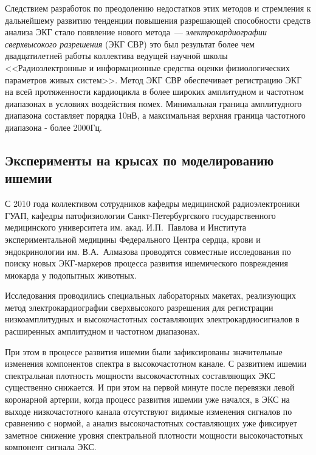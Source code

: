 \documentclass[a4paper,12pt]{extarticle}
\begin{document}
Следствием разработок по преодолению недостатков этих методов и стремления к дальнейшему развитию тенденции повышения разрешающей способности средств анализа ЭКГ стало появление нового метода~--- \textit{электрокардиографии сверхвысокого разрешения} (ЭКГ СВР) это был результат более чем двадцатилетней работы коллектива ведущей научной школы <<Радиоэлектронные и информационные средства оценки физиологических параметров живых систем>>. Метод ЭКГ СВР обеспечивает регистрацию ЭКГ на всей протяженности кардиоцикла в более широких амплитудном и частотном диапазонах в условиях воздействия помех. Минимальная граница амплитудного диапазона составляет порядка 10нВ, а максимальная верхняя граница частотного диапазона - более 2000Гц\cite{ECGSR13}.

\subsection{Эксперименты на крысах по моделированию ишемии}

С 2010 года коллективом сотрудников кафедры медицинской радиоэлектроники ГУАП, кафедры патофизиологии Санкт-Петербургского государственного медицинского университета им. акад. И.П.~Павлова и Института экспериментальной медицины Федерального Центра сердца, крови и эндокринологии им. В.А.~Алмазова проводятся совместные исследования по поиску новых ЭКГ-маркеров процесса развития ишемического повреждения миокарда у подопытных животных\cite{EIoA_GZ13}.

Исследования проводились специальных лабораторных макетах, реализующих метод электрокардиографии сверхвысокого разрешения для регистрации низкоамплитудных и высокочастотных составляющих электрокардиосигналов в расширенных амплитудном и частотном диапазонах.

При этом в процессе развития ишемии были зафиксированы значительные изменения компонентов спектра в высокочастотном канале. С развитием ишемии спектральная плотность мощности высокочастотных составляющих ЭКС существенно снижается. И при этом на первой минуте после перевязки левой коронарной артерии, когда процесс развития ишемии уже начался, в ЭКС на выходе низкочастотного канала отсутствуют видимые изменения сигналов по сравнению с нормой, а анализ высокочастотных составляющих уже фиксирует заметное снижение уровня спектральной плотности мощности высокочастотных компонент сигнала ЭКС.
\end{document}
